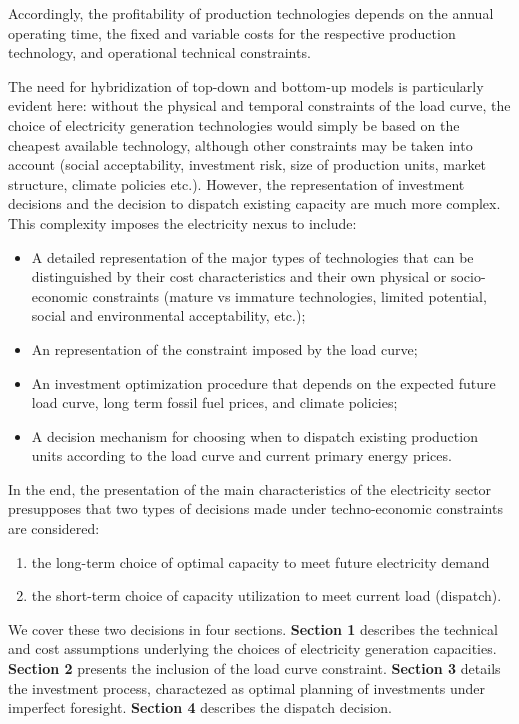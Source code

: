 Accordingly, the profitability of production technologies depends on the annual operating time,  the fixed and variable costs for the respective production technology, and operational technical constraints.

The need for hybridization of top-down and bottom-up models is particularly evident here: without the physical and temporal constraints of the load curve, the choice of electricity generation technologies would simply be based on the cheapest available technology, although other constraints may be taken into account (social acceptability, investment risk, size of production units, market structure, climate policies etc.). However, the representation of investment decisions and the decision to dispatch existing capacity are much more complex. This complexity imposes the electricity nexus to include:
\begin{itemize}
    \item A detailed representation of the major types of technologies that can be distinguished by their cost characteristics and their own physical or socio-economic constraints (mature vs immature technologies, limited potential, social and environmental acceptability, etc.);
    \item An representation of the constraint imposed by the load curve;
    \item An investment optimization procedure that depends on the expected future load curve, long term fossil fuel prices, and climate policies;
    \item A decision mechanism for choosing when to dispatch existing production units according to the load curve and current primary energy prices.
\end{itemize}


In the end, the presentation of the main characteristics of the electricity sector presupposes that two types of decisions made under techno-economic constraints are considered: 
\begin{enumerate}
    \item the long-term choice of optimal capacity to meet future electricity demand
    \item the short-term choice of capacity utilization to meet current load (dispatch).
\end{enumerate}

We cover these two decisions in four sections. \textbf{Section 1} describes the technical and cost assumptions underlying the choices of electricity generation capacities. \textbf{Section 2} presents the inclusion of the load curve constraint. \textbf{Section 3} details the investment process, charactezed as optimal planning of investments under imperfect foresight. \textbf{Section 4} describes the dispatch decision.

